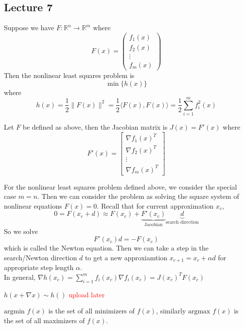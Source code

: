 \subsection{Lecture 7}
\begin{definition}
  Suppose we have $F: \mathbb R^n \to \mathbb R^m$ where $$F(x) = \begin{pmatrix}
    f_1(x) \\ f_2(x) \\ \vdots \\ f_m(x)
  \end{pmatrix}$$ Then the nonlinear least squares problem is $$\min \{h(x)\}$$ where $$h(x) = \frac{1}{2} \|F(x)\|^2 = \frac{1}{2}\langle F(x), F(x) \rangle = \frac{1}{2} \sum^m_{i=1} f_i^2(x)$$
\end{definition}
\begin{definition}
  Let $F$ be defined as above, then the Jacobian matrix is $J(x) = F'(x)$ where $$F'(x) = \begin{bmatrix}
    \nabla f_1(x)^T \\ \nabla f_2(x)^T \\ \vdots \\ \nabla f_m(x)^T
  \end{bmatrix}$$
\end{definition}
\begin{problem}
  For the nonlinear least squares problem defined above, we consider the special case $m = n$. Then we can consider the problem as solving the square system of nonlinear equations $F(x) = 0$. Recall that for current approximation $x_c$, $$0 = F(x_c + d) \approx F(x_c) + \underbrace{F'(x_c)}_{\text{Jacobian}}\underbrace{d}_{\text{search direction}}$$ So we solve $$F'(x_c)d = -F(x_c)$$ which is called the Newton equation. Then we can take a step in the search/Newton direction $d$ to get a new approxiamtion $x_{c+1} = x_c + \alpha d$ for appropriate step length $\alpha$.
  \\ In general, $\nabla h(x_c)=\sum_{i=1}^mf_i(x_c)\nabla f_i(x_c)=J(x_c)^TF(x_c)$
\end{problem}
\begin{definition}
  $h(x+\nabla x)\sim h()$ \textcolor{red}{upload later}
\end{definition}
\begin{definition}
  $\text{argmin } f(x)$ is the set of all minimizers of $f(x)$, similarly $\text{argmax }f(x)$ is the set of all maximizers of $f(x)$.
\end{definition}
